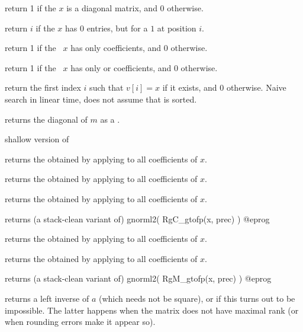  return 1 if the  $x$ is a
diagonal matrix, and 0 otherwise.

 return $i$ if the  $x$ has $0$ entries,
but for a $1$ at position $i$.

 return 1 if the ~$x$ has only
 coefficients, and 0 otherwise.

 return 1 if the ~$x$ has only
 or  coefficients, and 0 otherwise.

 return the first index $i$ such that
$v[i] = x$ if it exists, and $0$ otherwise. Naive search in linear time, does
not assume that  is sorted.

 returns the diagonal of $m$ as a .

 shallow version of 


 returns the  obtained by
applying  to all coefficients of $x$.

 returns the  obtained by
applying  to all coefficients of $x$.

 returns the  obtained by
applying  to all coefficients of $x$.

 returns (a stack-clean variant of)
\bprog
  gnorml2( RgC_gtofp(x, prec) )
@eprog

 returns the  obtained by
applying  to all coefficients of $x$.

 returns the  obtained by
applying  to all coefficients of $x$.

 returns (a stack-clean variant of)
\bprog
  gnorml2( RgM_gtofp(x, prec) )
@eprog


 returns a left inverse of $a$ (which needs not be
square), or  if this turns out to be impossible. The latter
happens when the matrix does not have maximal rank (or when rounding errors
make it appear so).

